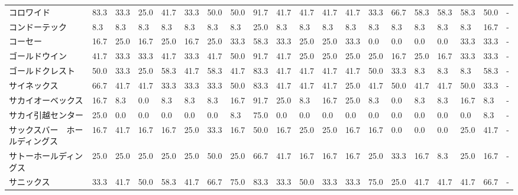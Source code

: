 \begin{tabular}{llllllllllllllllllll}
コロワイド           &   83.3 &   33.3 &      25.0 &      41.7 &       33.3 &   50.0 &   50.0 &   91.7 &    41.7 &    41.7 &   41.7 &  41.7 &   33.3 &    66.7 &    58.3 &  58.3 &  58.3 &  50.0 &     - \\
コンドーテック         &    8.3 &    8.3 &       8.3 &       8.3 &        8.3 &    8.3 &    8.3 &   25.0 &     8.3 &     8.3 &    8.3 &   8.3 &    8.3 &     8.3 &     8.3 &   8.3 &   8.3 &  16.7 &     - \\
コーセー            &   16.7 &   25.0 &      16.7 &      25.0 &       16.7 &   25.0 &   33.3 &   58.3 &    33.3 &    25.0 &   25.0 &  33.3 &    0.0 &     0.0 &     0.0 &   0.0 &  33.3 &  33.3 &     - \\
ゴールドウイン         &   41.7 &   33.3 &      33.3 &      41.7 &       33.3 &   41.7 &   50.0 &   91.7 &    41.7 &    25.0 &   25.0 &  25.0 &   25.0 &    16.7 &    25.0 &  16.7 &  33.3 &  33.3 &     - \\
ゴールドクレスト        &   50.0 &   33.3 &      25.0 &      58.3 &       41.7 &   58.3 &   41.7 &   83.3 &    41.7 &    41.7 &   41.7 &  41.7 &   50.0 &    33.3 &     8.3 &   8.3 &   8.3 &  58.3 &     - \\
サイネックス          &   66.7 &   41.7 &      41.7 &      33.3 &       33.3 &   33.3 &   50.0 &   83.3 &    41.7 &    41.7 &   41.7 &  25.0 &   41.7 &    50.0 &    41.7 &  41.7 &  50.0 &  33.3 &     - \\
サカイオーベックス       &   16.7 &    8.3 &       0.0 &       8.3 &        8.3 &    8.3 &   16.7 &   91.7 &    25.0 &     8.3 &   16.7 &  25.0 &    8.3 &     0.0 &     8.3 &   8.3 &  16.7 &   8.3 &     - \\
サカイ引越センター       &   25.0 &    0.0 &       0.0 &       0.0 &        0.0 &    0.0 &    8.3 &   75.0 &     0.0 &     0.0 &    0.0 &   0.0 &    0.0 &     0.0 &     0.0 &   0.0 &   0.0 &   8.3 &     - \\
サックスバー　ホールディングス &   16.7 &   41.7 &      16.7 &      16.7 &       25.0 &   33.3 &   16.7 &   50.0 &    16.7 &    25.0 &   25.0 &  16.7 &   16.7 &     0.0 &     0.0 &   0.0 &  25.0 &  41.7 &     - \\
サトーホールディングス     &   25.0 &   25.0 &      25.0 &      25.0 &       25.0 &   50.0 &   25.0 &   66.7 &    41.7 &    16.7 &   16.7 &  16.7 &   25.0 &    33.3 &    16.7 &   8.3 &  25.0 &  16.7 &     - \\
サニックス           &   33.3 &   41.7 &      50.0 &      58.3 &       41.7 &   66.7 &   75.0 &   83.3 &    33.3 &    50.0 &   33.3 &  33.3 &   75.0 &    25.0 &    41.7 &  41.7 &  41.7 &  66.7 &     - \\

\end{tabular}
